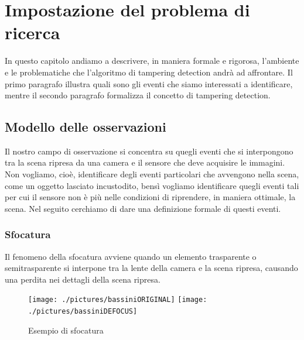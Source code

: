 \chapter{Impostazione del problema di ricerca}
\label{FormulazioneProblema}
\thispagestyle{empty}

\vspace{0.5cm}
In questo capitolo andiamo a descrivere, in maniera formale e rigorosa, l'ambiente e le problematiche  che l'algoritmo di tampering detection andr\`a ad affrontare. Il primo paragrafo illustra quali sono gli eventi che siamo interessati a identificare, mentre il secondo paragrafo formalizza il concetto di tampering detection.
\noindent 
\section{Modello delle osservazioni}
Il nostro campo di osservazione si concentra su quegli eventi che si interpongono tra la scena ripresa da una camera e il sensore che deve acquisire le immagini. Non vogliamo, cio\`e, identificare degli eventi particolari che avvengono nella scena, come un oggetto lasciato incustodito, bens\`i vogliamo identificare quegli eventi tali per cui il sensore non \`e pi\`u nelle condizioni di riprendere, in maniera ottimale, la scena.
Nel seguito cerchiamo di dare una definizione formale di questi eventi.
\subsection{Sfocatura}
Il fenomeno della sfocatura avviene quando un elemento trasparente o semitrasparente si interpone tra la lente della camera e la scena ripresa, causando una perdita nei dettagli della scena ripresa.

\begin{figure}
	\centering
	\texttt{[image: ./pictures/bassiniORIGINAL]}
	\texttt{[image: ./pictures/bassiniDEFOCUS]}
	\caption{Esempio di sfocatura}
	\label{fig:bassiniDEFOCUS}
\end{figure}

